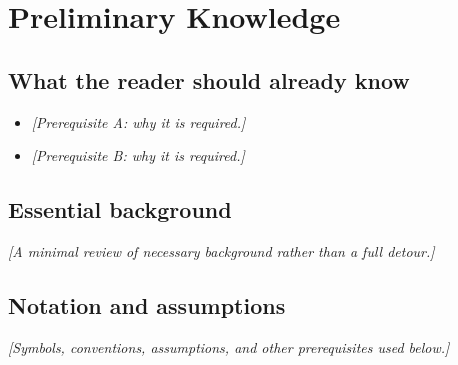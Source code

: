 \section{Preliminary Knowledge}
\label{sec:preliminaries}

\subsection{What the reader should already know}
\begin{itemize}
  \item \emph{[Prerequisite A: why it is required.]}
  \item \emph{[Prerequisite B: why it is required.]}
\end{itemize}

\subsection{Essential background}
\emph{[A minimal review of necessary background rather than a full detour.]}

\subsection{Notation and assumptions}
\emph{[Symbols, conventions, assumptions, and other prerequisites used below.]}
